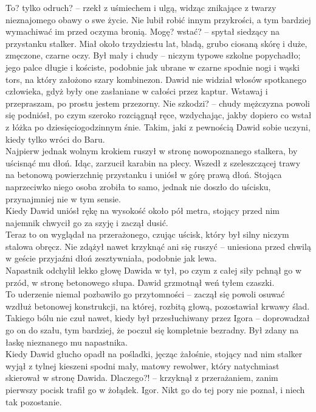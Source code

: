 \documentclass[../MAIN.tex]{subfiles}
\begin{document}
\sx To? tylko odruch? -- rzekł z uśmiechem i ulgą, widząc znikające z twarzy nieznajomego obawy o swe życie.
\qd
Nie lubił robić innym przykrości, a tym bardziej wymachiwać im przed oczyma bronią.
\sx Mogę? wstać? -- spytał siedzący na przystanku stalker. 
\qd
Miał około trzydziestu lat, bladą, grubo ciosaną skórę i duże, zmęczone, czarne oczy. Był mały i chudy -- niczym typowe szkolne popychadło; jego palce długie i kościste, podobnie jak ubrane w czarne spodnie nogi i wąski tors, na który założono szary kombinezon. Dawid nie widział włosów spotkanego człowieka, gdyż były one zasłaniane w całości przez kaptur.
\sx Wstawaj i przepraszam, po prostu jestem przezorny.
\xx Nie szkodzi? -- chudy mężczyzna powoli się podniósł, po czym szeroko rozciągnął ręce, wzdychając, jakby dopiero co wstał z łóżka po dziesięciogodzinnym śnie. 
\qd
Takim, jaki z pewnością Dawid sobie uczyni, kiedy tylko wróci do Baru.\\
Najpierw jednak wolnym krokiem ruszył w stronę nowopoznanego stalkera, by uścisnąć mu dłoń. Idąc, zarzucił karabin na plecy. Wszedł z szeleszczącej trawy na betonową powierzchnię przystanku i uniósł w górę prawą dłoń. Stojąca naprzeciwko niego osoba zrobiła to samo, jednak nie doszło do uścisku, przynajmniej nie w tym sensie.\\
Kiedy Dawid uniósł rękę na wysokość około pół metra, stojący przed nim najemnik chwycił go za szyję i zaczął dusić.\\
Teraz to on wyglądał na przerażonego, czując uścisk, który był silny niczym stalowa obręcz. Nie zdążył nawet krzyknąć ani się ruszyć -- uniesiona przed chwilą w geście przyjaźni dłoń zesztywniała, podobnie jak lewa.\\
Napastnik odchylił lekko głowę Dawida w tył, po czym z całej siły pchnął go w przód, w stronę betonowego słupa. Dawid grzmotnął weń tyłem czaszki.\\
To uderzenie niemal pozbawiło go przytomności -- zaczął się powoli osuwać wzdłuż betonowej konstrukcji, na której, rozbitą głową, pozostawiał krwawy ślad. Takiego bólu nie czuł nawet, kiedy był przesłuchiwany przez Igora -- doprowadzał go on do szału, tym bardziej, że poczuł się kompletnie bezradny. Był zdany na łaskę nieznanego mu napastnika.\\
Kiedy Dawid głucho opadł na pośladki, jęcząc żałośnie, stojący nad nim stalker wyjął z tylnej kieszeni spodni mały, matowy rewolwer, który natychmiast skierował w stronę Dawida.
\sx Dlaczego?! -- krzyknął z przerażaniem, zanim pierwszy pocisk trafił go w żołądek.
\xx Igor. Nikt go do tej pory nie poznał, i niech tak pozostanie.
\end{document}
